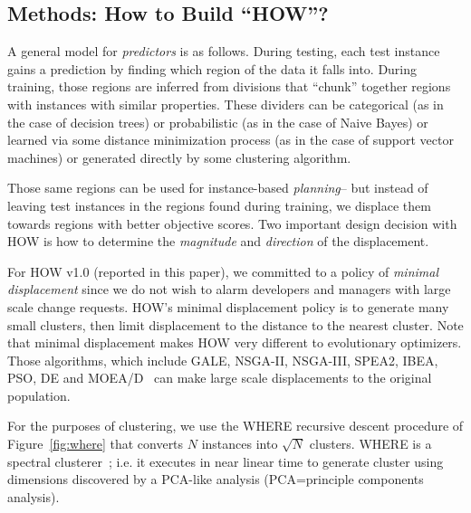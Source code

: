 \documentclass[conference]{IEEEtran}
\newcommand{\fig}[1]{Figure~\ref{fig:#1}}
\begin{document}
\subsection{Methods: How to Build ``HOW''?}

A general model for {\em predictors} is as follows. 
During testing, each test instance gains a prediction 
by finding which region of the data it falls into.
During training, those regions are inferred from
divisions that ``chunk'' together regions with instances
with similar properties. These dividers can be categorical (as in the case of decision trees) or probabilistic (as in the
case of Naive Bayes) or learned via some distance minimization
process 
(as in the case of support vector machines) or generated
directly by some clustering algorithm. 

Those same regions can be used for instance-based 
{\em planning}-- but instead of leaving test instances in the regions
found during training, we displace them towards regions
with better objective scores. 
Two important design decision with HOW 
is how to determine the {\em magnitude} and {\em direction} of the
displacement.
 
For HOW v1.0 (reported in this paper), we committed to a policy
of {\em minimal displacement}  since we do not wish to alarm developers and managers
with large scale change requests.
HOW's minimal displacement policy is to generate
many small clusters, then limit displacement to the distance
to the nearest cluster.
Note that minimal displacement makes HOW very different
to evolutionary optimizers.
Those algorithms, which include  
GALE, NSGA-II, NSGA-III, SPEA2, IBEA, PSO, DE and  MOEA/D~\cite{krall14,deb00a,zit02,zit04,%
deb14,Cui2005a,storn97,zhang07:TEC} can make large scale
displacements to the original population.
 
For the purposes of clustering, we use the WHERE recursive
descent procedure of \fig{where} that converts
$N$ instances into $\sqrt{N}$ clusters.
WHERE is a spectral clusterer~\cite{kamvar03}; i.e. it
executes in near linear time to generate
cluster using dimensions  discovered
by a  PCA-like analysis (PCA=principle components analysis).
 
\end{document}
